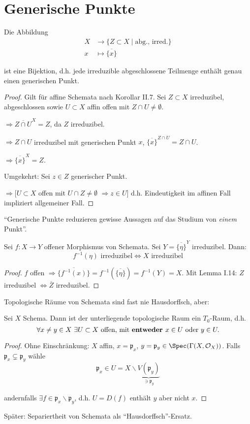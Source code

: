 \section{Generische Punkte }
\begin{prop}[18]
  Die Abbildung
  \begin{align*}
    X & \longrightarrow\{Z\subset X\mid\text{abg., irred.}\}\\
    x & \longmapsto\overline{\{x\}}
  \end{align*}

  ist eine Bijektion, d.h. jede irreduzible abgeschlossene Teilmenge
  enthält genau einen generischen Punkt.
\end{prop}

\begin{proof}
  Gilt für affine Schemata nach Korollar II.7. Sei $Z\subset X$ irreduzibel,
  abgeschlossen sowie $U\subset X$ affin offen mit $Z\cap U\neq\emptyset$.

  $\Longrightarrow\overline{Z\cap U}^{X}=Z$, da $Z$ irreduzibel.

  $\Longrightarrow Z\cap U$ irreduzibel mit generischen Punkt $x$,
  $\overline{\{x\}}^{Z\cap U}=Z\cap U$.

  $\Longrightarrow\overline{\{x\}}^{X}=Z$.

  Umgekehrt: Sei $z\in Z$ generischer Punkt.

  $\Longrightarrow[U\subset X$ offen mit $U\cap Z\neq\emptyset$ $\Rightarrow z\in U]$
  d.h. Eindeutigkeit im affinen Fall impliziert allgemeiner Fall.
\end{proof}
``Generische Punkte reduzieren gewisse Aussagen auf das Studium von
\emph{einem} Punkt''.
\begin{prop}[19]
  Sei $f:X\rightarrow Y$ offener Morphismus von Schemata. Sei $Y=\overline{\{\eta\}}^{Y}$
  irreduzibel. Dann:
  \[
    f^{-1}(\eta)\text{ irreduzibel}\Leftrightarrow X\text{ irreduzibel}
  \]
\end{prop}

\begin{proof}
  $f$ offen $\Rightarrow\overline{\{f^{-1}(x)\}}=f^{-1}(\overline{\{\eta\}})=f^{-1}(Y)=X$.
  Mit Lemma I.14: $Z$ irreduzibel $\Leftrightarrow\overline{Z}$ irreduzibel.
\end{proof}
Topologische Räume von Schemata sind fast nie Hausdorffsch, aber:
\begin{prop}[20]
  Sei $X$ Schema. Dann ist der unterliegende topologische Raum ein
  $T_{0}$-Raum, d.h.
  \[
    \forall x\neq y\in X\ \exists U\subset X\text{ offen, mit \textbf{entweder }}x\in U\text{ oder }y\in U.
  \]
\end{prop}

\begin{proof}
  Ohne Einschränkung: $X$ affin, $x=\mathfrak{p}_{x}$, $y=\mathfrak{p}_{y}\in\Spec(\Gamma(X,\mathcal{O}_{X}))$.
  Falls $\mathfrak{p}_{x}\subsetneq\mathfrak{p}_{y}$ wähle
  \[
    \mathfrak{p}_{x}\in U=X\backslash\underbrace{V(\mathfrak{p}_{y})}_{\ni\mathfrak{p}_{y}}
  \]

  andernfalls $\exists f\in\mathfrak{p}_{x}\backslash\mathfrak{p}_{y}$,
  d.h. $U=D(f)$ enthält $y$ aber nicht $x$.
\end{proof}
Später: Separiertheit von Schemata als ``Hausdorffsch''-Ersatz.
